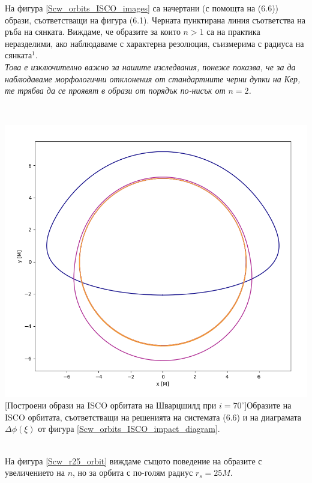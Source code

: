 \begin{minipage}{16em}
На фигура \ref{Scw_orbits_ISCO_images} са начертани (с помощта на (6.6)) образи, съответстващи на фигура (6.1). Черната пунктирана линия съответства на ръба на сянката. Виждаме, че образите за които $n>1$ са на практика неразделими, ако наблюдаваме с характерна резолюция, съизмерима с радиуса на сянката$^1$.\\

\emph{Това е изключително важно за нашите изследвания, понеже показва, че за да наблюдаваме морфологични отклонения от стандартните черни дупки на Кер, те трябва да се проявят в образи от порядък по-нисък от $n = 2$.}
\end{minipage}\,\,\,
\begin{minipage}{17em}
	\includegraphics[scale = 0.3]{Schw_70_deg_ISCO.png}
	[Построени образи на ISCO орбитата на Шварцшилд при $i = 70^\circ$]{\small Образите на ISCO орбитата, съответстващи на решенията на системата (6.6) и на диаграмата $\Delta\phi(\xi)$ от фигура \ref{Scw_orbits_ISCO_impact_diagram}.}
	\label{Scw_orbits_ISCO_images}
\end{minipage}\\

На фигура \ref{Scw_r25_orbit} виждаме същото поведение на образите с увеличението на $n$, но за орбита с по-голям радиус $r_s = 25M$.

